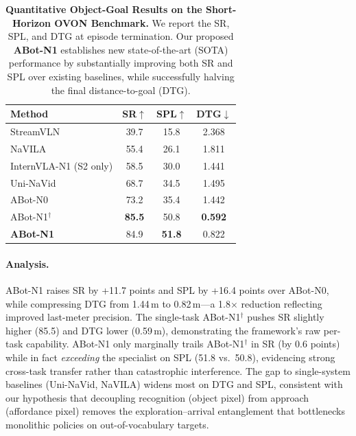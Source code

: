 \begin{table}[t]
\centering
\caption{\textbf{Quantitative Object-Goal Results on the Short-Horizon OVON Benchmark.} 
We report the SR, SPL, and DTG at episode termination. 
Our proposed \textbf{ABot-N1} establishes new state-of-the-art (SOTA) performance by substantially improving both SR and SPL over existing baselines, while successfully halving the final distance-to-goal (DTG).}




\label{tab:exp-objgoal}
\small
\begin{tabular}{lccc}
\toprule
\textbf{Method} & SR$\uparrow$ & SPL$\uparrow$ & DTG$\downarrow$ \\
\midrule
StreamVLN \cite{wei2025streamvln}              & 39.7 & 15.8 & 2.368 \\
NaVILA    \cite{cheng2025navila}             & 55.4 & 26.1 & 1.811 \\
InternVLA-N1 (S2 only) \cite{wei2025ground} & 58.5 & 30.0 & 1.441 \\
Uni-NaVid \cite{zhang2024uninavid}            & 68.7 & 34.5 & 1.495 \\
ABot-N0 \cite{abotn0}               & 73.2 & 35.4 & 1.442 \\
\midrule
ABot-N1$^\dagger$            & \textbf{85.5} & 50.8 & \textbf{0.592} \\
\textbf{ABot-N1}          & 84.9 & \textbf{51.8} & 0.822 \\
\bottomrule
\end{tabular}
\end{table}

\paragraph{Analysis.}
ABot-N1 raises SR by +11.7 points and SPL by +16.4 points over
ABot-N0, while compressing DTG from 1.44\,m to 0.82\,m---a
1.8$\times$ reduction reflecting improved last-meter precision.
The single-task ABot-N1$^\dagger$ pushes SR slightly higher (85.5)
and DTG lower (0.59\,m), demonstrating the framework's raw per-task
capability. ABot-N1 only marginally trails ABot-N1$^\dagger$ in SR
(by 0.6 points) while in fact \emph{exceeding} the specialist on
SPL (51.8 vs.\ 50.8), evidencing strong cross-task transfer rather
than catastrophic interference.
The gap to single-system baselines (Uni-NaVid, NaVILA) widens
most on DTG and SPL, consistent with our hypothesis that
decoupling recognition (object pixel) from approach (affordance
pixel) removes the exploration--arrival entanglement that
bottlenecks monolithic policies on out-of-vocabulary targets.

